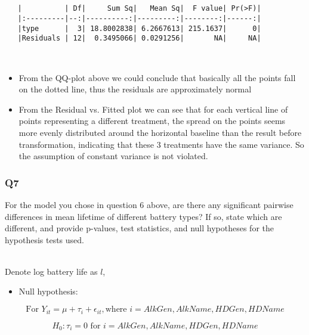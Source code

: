 \documentclass[11pt]{article}
\providecommand{\tightlist}{%
      \setlength{\itemsep}{0pt}\setlength{\parskip}{0pt}}
\begin{document}
    
    \begin{verbatim}
   
   
   |          | Df|     Sum Sq|   Mean Sq|  F value| Pr(>F)|
   |:---------|--:|----------:|---------:|--------:|------:|
   |type      |  3| 18.8002838| 6.2667613| 215.1637|      0|
   |Residuals | 12|  0.3495066| 0.0291256|       NA|     NA|
   \end{verbatim}

    
    \begin{center}
    \end{center}
    { \hspace*{\fill} \\}
    
    \begin{itemize}
\item
  From the QQ-plot above we could conclude that basically all the points
  fall on the dotted line, thus the residuals are approximately normal
\item
  From the Residual vs. Fitted plot we can see that for each vertical
  line of points representing a different treatment, the spread on the
  points seems more evenly distributed around the horizontal baseline
  than the result before transformation, indicating that these 3
  treatments have the same variance. So the assumption of constant
  variance is not violated.
\end{itemize}

    \subsubsection*{Q7}\label{q7}

For the model you chose in question 6 above, are there any significant
pairwise differences in mean lifetime of different battery types? If so,
state which are different, and provide p-values, test statistics, and
null hypotheses for the hypothesis tests used.\\\

    Denote log battery life as \(l\),

\begin{itemize}
\tightlist
\item
  Null hypothesis:
\end{itemize}

\[\text{For } Y_{it}=\mu +\tau_i+\epsilon_{it},  \text{where } i=AlkGen,AlkName,HDGen,HDName\]

\[H_0: \tau _i= 0 \text{ for } i=AlkGen,AlkName,HDGen,HDName\]
\end{document}
